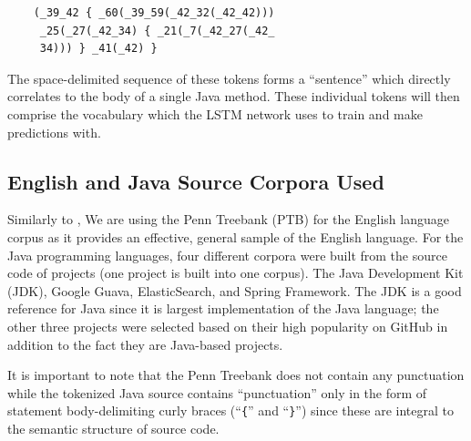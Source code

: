 \documentclass{article}
\begin{document}
\begin{verbatim}
    (_39_42 { _60(_39_59(_42_32(_42_42)))
     _25(_27(_42_34) { _21(_7(_42_27(_42_
     34))) } _41(_42) } 
\end{verbatim}

The space-delimited sequence of these tokens forms a ``sentence'' which  
directly  correlates to the body of a single Java method. These individual  
tokens will then comprise the vocabulary which the LSTM network uses to train 
and make predictions with.

\subsection{English and Java Source Corpora Used}

Similarly to \citet{LSTMArticle}, We are using the Penn Treebank (PTB) for the
English language corpus as it provides an effective, general sample of the English
language. %
For the Java programming languages, four different corpora were built from
the source code of projects (one project is built into one corpus). The
Java Development Kit (JDK), Google Guava, ElasticSearch, and Spring Framework.
The JDK is a good reference for Java since it is largest implementation
of the Java language; the other three projects were selected based on their
high popularity on GitHub in addition to the fact they are
Java-based projects.

It is important to note that the
Penn Treebank does not contain any punctuation while the tokenized
Java source contains ``punctuation'' only in the form of statement
body-delimiting curly braces (``\texttt\{'' and ``\texttt\}'')
since these are integral to the semantic structure of source code.
\end{document}
